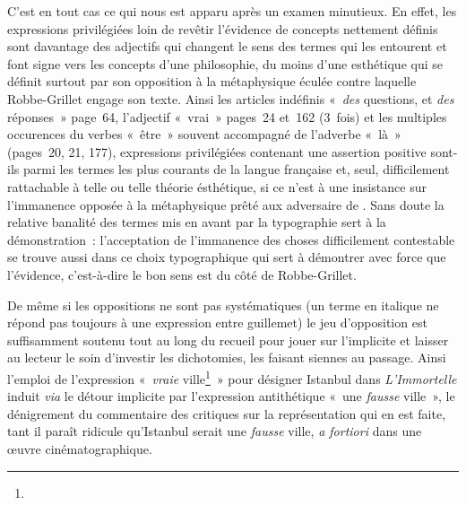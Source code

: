 \documentclass[12pt, a4paper]{article}
\begin{document}
C'est en tout cas ce qui nous est apparu après un examen minutieux. En effet, les expressions privilégiées loin de revêtir l'évidence de concepts nettement définis sont davantage des adjectifs qui changent le sens des termes qui les entourent et font signe vers les concepts d'une philosophie, du moins d'une esthétique qui se définit surtout par son opposition à la métaphysique éculée contre laquelle Robbe-Grillet engage son texte. Ainsi les articles indéfinis «~\textit{des} questions, et \textit{des} réponses~» page~64, l'adjectif «~vrai~» pages~24 et~162 (3~fois) et les multiples occurences du verbes «~être~» souvent accompagné de l'adverbe «~là~» (pages~20, 21, 177), expressions privilégiées contenant une assertion positive sont-ils parmi les termes les plus courants de la langue française et, seul, difficilement rattachable à telle ou telle théorie ésthétique, si ce n'est à une insistance sur l'immanence opposée à la métaphysique prêté aux adversaire de \robbe{}. Sans doute la relative banalité des termes mis en avant par la typographie sert à la démonstration~: l'acceptation de l'immanence des choses difficilement contestable se trouve aussi dans ce choix typographique qui sert à démontrer avec force que l'évidence, c'est-à-dire le bon sens est du côté de Robbe-Grillet.






De même si les oppositions ne sont pas systématiques (un terme en italique ne répond pas toujours à une expression entre guillemet) le jeu d'opposition est suffisamment soutenu tout au long du recueil pour jouer sur l'implicite et laisser au lecteur le soin d'investir les dichotomies, les faisant siennes au passage. Ainsi l'emploi de l'expression «~\textit{vraie} ville\footnote{}~» pour désigner Istanbul dans \textit{L'Immortelle} induit \textit{via} le détour implicite par l'expression antithétique «~une \textit{fausse} ville~», le dénigrement du commentaire des critiques sur la représentation qui en est faite, tant il paraît ridicule qu'Istanbul serait une \textit{fausse} ville, \textit{a fortiori} dans une œuvre cinématographique.



\end{document}
